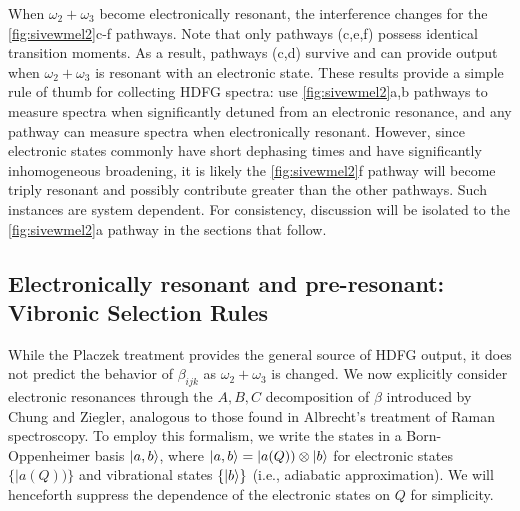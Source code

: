 \documentclass[aip, jcp, reprint, twocolumn]{revtex4-2}
\begin{document}
When $\omega_2 + \omega_3$ become electronically resonant, the interference changes for the \autoref{fig:sivewmel2}c-f pathways.
Note that only pathways (c,e,f) possess identical transition moments.
As a result, pathways (c,d) survive and can provide output when $\omega_2+\omega_3$ is resonant with an electronic state. 
These results provide a simple rule of thumb for collecting HDFG spectra: use \autoref{fig:sivewmel2}a,b pathways to measure spectra when significantly detuned from an electronic resonance, and any pathway can measure spectra when electronically resonant.
However, since electronic states commonly have short dephasing times and have significantly inhomogeneous broadening,\cite{Dong2015, Lewis2015} it is likely the \autoref{fig:sivewmel2}f pathway will become triply resonant and possibly contribute greater than the other pathways. 
Such instances are system dependent. 
For consistency, discussion will be isolated to the \autoref{fig:sivewmel2}a pathway in the sections that follow.

\subsection{Electronically resonant and pre-resonant: Vibronic Selection Rules}

While the Placzek treatment provides the general source of HDFG output, it does not predict the behavior of $\beta_{ijk}$ as $\omega_2 + \omega_3$ is changed.
We now explicitly consider electronic resonances through the $A,B,C$ decomposition of $\beta$ introduced by Chung and Ziegler, analogous to those found in Albrecht's treatment of Raman spectroscopy.\cite{Albrecht1961, Ziegler1988} 
To employ this formalism, we write the states in a Born-Oppenheimer basis $\ket{a,b}$, where $\ket{a,b} = |a(Q)) \otimes \ket{b}$ for electronic states $\{|a(Q))\}$ and vibrational states $\{\ket{b}\}$ (i.e., adiabatic approximation). \cite{BornOppenheimer, Tang1970}
We will henceforth suppress the dependence of the electronic states on $Q$ for simplicity.
\end{document}
